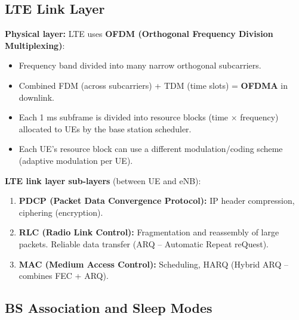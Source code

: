 \subsection{LTE Link Layer}

\begin{keybox}
\textbf{Physical layer:} LTE uses \textbf{OFDM (Orthogonal Frequency Division Multiplexing)}:
\begin{itemize}[noitemsep]
    \item Frequency band divided into many narrow orthogonal subcarriers.
    \item Combined FDM (across subcarriers) + TDM (time slots) = \textbf{OFDMA} in downlink.
    \item Each 1 ms subframe is divided into resource blocks (time $\times$ frequency) allocated to UEs by the base station scheduler.
    \item Each UE's resource block can use a different modulation/coding scheme (adaptive modulation per UE).
\end{itemize}

\medskip
\textbf{LTE link layer sub-layers} (between UE and eNB):
\begin{enumerate}[noitemsep]
    \item \textbf{PDCP (Packet Data Convergence Protocol):} IP header compression, ciphering (encryption).
    \item \textbf{RLC (Radio Link Control):} Fragmentation and reassembly of large packets. Reliable data transfer (ARQ -- Automatic Repeat reQuest).
    \item \textbf{MAC (Medium Access Control):} Scheduling, HARQ (Hybrid ARQ -- combines FEC + ARQ).
\end{enumerate}
\end{keybox}

\subsection{BS Association and Sleep Modes}


